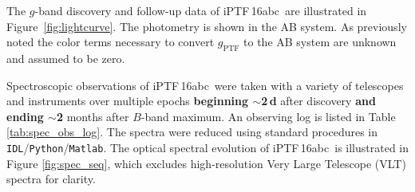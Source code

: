 \documentclass[twocolumn]{aastex61}
\newcommand{\abc}{iPTF\,16abc}
\begin{document}
The $g$-band discovery and follow-up data of \abc\ are illustrated in
Figure~\ref{fig:lightcurve}. The photometry is shown in the AB system. As
previously noted the color terms necessary to convert $g_\mathrm{PTF}$ to the
AB system are unknown and assumed to be zero.

Spectroscopic observations of \abc\ were taken with a variety of telescopes
and instruments over multiple epochs \textbf{beginning $\sim$2\,d} after
discovery \textbf{and ending $\sim$2} months after $B$-band maximum. An
observing log is listed in Table \ref{tab:spec_obs_log}. The spectra were
reduced using standard procedures in
\texttt{IDL}/\texttt{Python}/\texttt{Matlab}. The optical spectral evolution
of \abc\ is illustrated in Figure \ref{fig:spec_seq}, which excludes
high-resolution Very Large Telescope (VLT) spectra for clarity.
\end{document}
